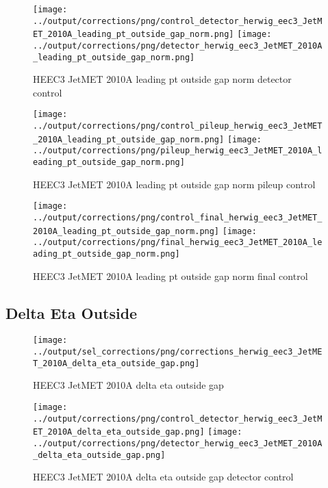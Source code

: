 \documentclass[11pt]{book}
\begin{document}
\begin{figure}[ht]
\centering
\texttt{[image: ../output/corrections/png/control\_detector\_herwig\_eec3\_JetMET\_2010A\_leading\_pt\_outside\_gap\_norm.png]}
\texttt{[image: ../output/corrections/png/detector\_herwig\_eec3\_JetMET\_2010A\_leading\_pt\_outside\_gap\_norm.png]}
\caption{HEEC3 JetMET 2010A leading pt outside gap norm detector control}
\label{fig:HEEC3_JetMET_2010A_leading_pt_outside_gap_norm_detector_control}
\end{figure}

\begin{figure}[ht]
\centering
\texttt{[image: ../output/corrections/png/control\_pileup\_herwig\_eec3\_JetMET\_2010A\_leading\_pt\_outside\_gap\_norm.png]}
\texttt{[image: ../output/corrections/png/pileup\_herwig\_eec3\_JetMET\_2010A\_leading\_pt\_outside\_gap\_norm.png]}
\caption{HEEC3 JetMET 2010A leading pt outside gap norm pileup control}
\label{fig:HEEC3_JetMET_2010A_leading_pt_outside_gap_norm_pileup_control}
\end{figure}


\begin{figure}[ht]
\centering
\texttt{[image: ../output/corrections/png/control\_final\_herwig\_eec3\_JetMET\_2010A\_leading\_pt\_outside\_gap\_norm.png]}
\texttt{[image: ../output/corrections/png/final\_herwig\_eec3\_JetMET\_2010A\_leading\_pt\_outside\_gap\_norm.png]}
\caption{HEEC3 JetMET 2010A leading pt outside gap norm final control}
\label{fig:HEEC3_JetMET_2010A_leading_pt_outside_gap_norm_final_control}
\end{figure}



\clearpage
\subsection{Delta Eta Outside}
\begin{figure}[ht]
\centering
\texttt{[image: ../output/sel\_corrections/png/corrections\_herwig\_eec3\_JetMET\_2010A\_delta\_eta\_outside\_gap.png]}
\caption{HEEC3 JetMET 2010A delta eta outside gap}
\label{fig:HEEC3_JetMET_2010A_delta_eta_outside_gap}
\end{figure}

\begin{figure}[ht]
\centering
\texttt{[image: ../output/corrections/png/control\_detector\_herwig\_eec3\_JetMET\_2010A\_delta\_eta\_outside\_gap.png]}
\texttt{[image: ../output/corrections/png/detector\_herwig\_eec3\_JetMET\_2010A\_delta\_eta\_outside\_gap.png]}
\caption{HEEC3 JetMET 2010A delta eta outside gap detector control}
\label{fig:HEEC3_JetMET_2010A_delta_eta_outside_gap_detector_control}
\end{figure}
\end{document}

